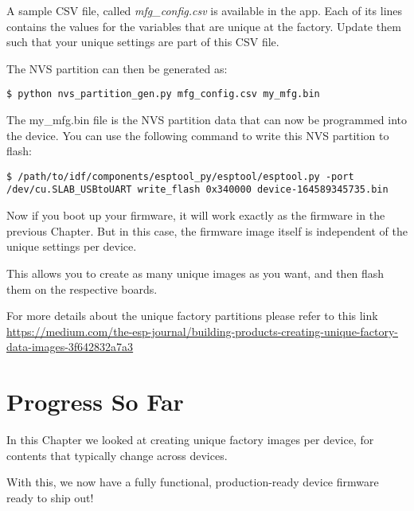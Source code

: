 \documentclass[main.tex]{subfiles}
\begin{document}
A sample CSV file, called \textit{mfg\_config.csv} is available in the app. Each of its lines contains the values for the variables that are unique at the factory.
Update them such that your unique settings are part of this CSV file.

The NVS partition can then be generated as:
\begin{verbatim}
$ python nvs_partition_gen.py mfg_config.csv my_mfg.bin
\end{verbatim}

The my\_mfg.bin file is the NVS partition data that can now be programmed into the device. You can use the following command to write this NVS partition to flash:
\begin{verbatim}
$ /path/to/idf/components/esptool_py/esptool/esptool.py -port /dev/cu.SLAB_USBtoUART write_flash 0x340000 device-164589345735.bin
\end{verbatim}

Now if you boot up your firmware, it will work exactly as the firmware in the previous Chapter. But in this case, the firmware image itself is independent of the unique settings per device. 

This allows you to create as many unique images as you want, and then flash them on the respective boards.

For more details about the unique factory partitions please refer to this link \url{https://medium.com/the-esp-journal/building-products-creating-unique-factory-data-images-3f642832a7a3}

\section{Progress So Far}
In this Chapter we looked at creating unique factory images per device, for contents that typically change across devices.

With this, we now have a fully functional, production-ready device firmware ready to ship out!
\end{document}
